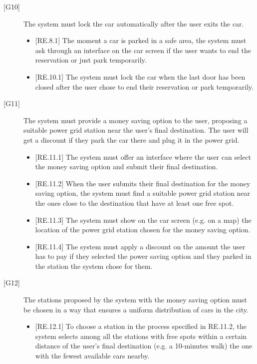 \documentclass[english]{article}
\begin{document}
\begin{description}
\item[{[G10]}]{The system must lock the car automatically after the user exits the car.
\begin{itemize}
	\item{[RE.8.1] The moment a car is parked in a safe area, the system must ask through an interface on the car screen if the user wants to end the reservation or just park temporarily.}
	\item{[RE.10.1] The system must lock the car when the last door has been closed after the user chose to end their reservation or park temporarily.}
\end{itemize}
}

\item[{[G11]}]{The system must provide a money saving option to the user, proposing a suitable power grid station near the user’s final destination. The user will get a discount if they park the car there and plug it in the power grid.
\begin{itemize}
	\item{[RE.11.1] The system must offer an interface where the user can select the money saving option and submit their final destination.}
	\item{[RE.11.2] When the user submits their final destination for the money saving option, the system must find a suitable power grid station near the ones close to the destination that have at least one free spot.}
	\item{[RE.11.3] The system must show on the car screen (e.g. on a map) the location of the power grid station chosen for the money saving option.}
	\item{[RE.11.4] The system must apply a discount on the amount the user has to pay if they selected the power saving option and they parked in the station the system chose for them.}
\end{itemize}
}

\item[{[G12]}]{The stations proposed by the system with the money saving option must be chosen in a way that ensures a uniform distribution of cars in the city.
\begin{itemize}
	\item{[RE.12.1] To choose a station in the process specified in RE.11.2, the system selects among all the stations with free spots within a certain distance of the user’s final destination (e.g. a 10-minutes walk) the one with the fewest available cars nearby.}
\end{itemize}
}


\end{description}
\end{document}
